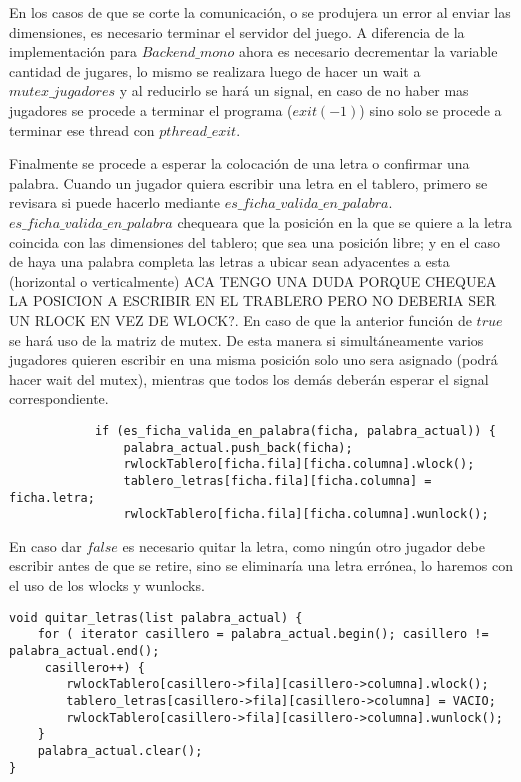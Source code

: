 En los casos de que se corte la comunicación, o se produjera un error al enviar las dimensiones, es necesario terminar el servidor del juego. A diferencia de la implementación para $Backend\_mono$ ahora es necesario decrementar la variable cantidad de jugares, lo mismo se realizara luego de hacer un wait a $mutex\_jugadores$ y al reducirlo se hará un signal, en caso de no haber mas jugadores se procede a terminar el programa ($exit(-1)$) sino solo se procede a terminar ese thread con $pthread\_exit$. 

Finalmente se procede a esperar la colocación de una letra o confirmar una palabra.
Cuando un jugador quiera escribir una letra en el tablero, primero se revisara si puede hacerlo mediante $es\_ficha\_valida\_en\_palabra$.  $es\_ficha\_valida\_en\_palabra$ chequeara que la posición en la que se quiere a la letra coincida con las dimensiones del  tablero; que sea una posición libre; y en el caso de haya una palabra completa las letras a ubicar sean adyacentes a esta (horizontal o verticalmente) ACA TENGO UNA DUDA PORQUE CHEQUEA LA POSICION A ESCRIBIR EN EL TRABLERO PERO NO DEBERIA  SER UN RLOCK EN VEZ DE WLOCK?. En caso de que la anterior función de $true$  se hará uso de la matriz de mutex. De esta manera si simultáneamente varios jugadores quieren escribir en una misma posición solo uno sera asignado (podrá hacer wait del mutex), mientras que todos los demás deberán esperar el signal correspondiente. 
\begin{verbatim}
            if (es_ficha_valida_en_palabra(ficha, palabra_actual)) {
                palabra_actual.push_back(ficha);
                rwlockTablero[ficha.fila][ficha.columna].wlock();
                tablero_letras[ficha.fila][ficha.columna] = ficha.letra;
                rwlockTablero[ficha.fila][ficha.columna].wunlock(); 
\end{verbatim}
En caso dar $false$ es necesario quitar la letra, como ningún otro jugador debe escribir antes de que se retire, sino se eliminaría una letra errónea, lo haremos con el uso de los wlocks y wunlocks.
\begin{verbatim}
void quitar_letras(list palabra_actual) {
    for ( iterator casillero = palabra_actual.begin(); casillero != palabra_actual.end();
     casillero++) {
        rwlockTablero[casillero->fila][casillero->columna].wlock();
        tablero_letras[casillero->fila][casillero->columna] = VACIO;
        rwlockTablero[casillero->fila][casillero->columna].wunlock();
    }
    palabra_actual.clear();
}
\end{verbatim}
